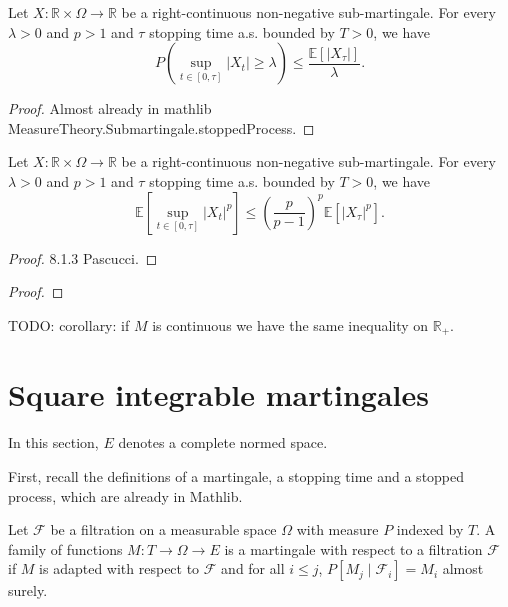\begin{lemma}\label{lem:doob_ineq_stop}
  Let $X:\mathbb{R}\times\Omega\rightarrow \mathbb{R}$ be a right-continuous non-negative sub-martingale.
  For every $\lambda>0$ and $p>1$ and $\tau$ stopping time a.s. bounded by $T>0$, we have
  $$
  P\left( \sup_{t\in[0,\tau]}|X_t|\geq\lambda \right)\leq \frac{\mathbb{E}[|X_\tau|]}{\lambda}.
  $$
\end{lemma}
\begin{proof}
  Almost already in mathlib MeasureTheory.Submartingale.stoppedProcess.
\end{proof}

\begin{lemma}\label{lem:doob_ineq_stop_exp_val}
  Let $X:\mathbb{R}\times\Omega\rightarrow \mathbb{R}$ be a right-continuous non-negative sub-martingale.
  For every $\lambda>0$ and $p>1$ and $\tau$ stopping time a.s. bounded by $T>0$, we have
  $$
  \mathbb{E}\left[ \sup_{t\in[0,\tau]}|X_t|^p \right]\leq \left(\frac{p}{p-1}\right)^p\mathbb{E}[|X_\tau|^p].
  $$
\end{lemma}
\begin{proof}
  8.1.3 Pascucci.
\end{proof}

\begin{proof}

\end{proof}

TODO: corollary: if $M$ is continuous we have the same inequality on $\mathbb{R}_+$.


\section{Square integrable martingales}

In this section, $E$ denotes a complete normed space.

First, recall the definitions of a martingale, a stopping time and a stopped process, which are already in Mathlib.


\begin{definition}[Martingale]\label{def:Martingale}
  \mathlibok
Let $\mathcal{F}$ be a filtration on a measurable space $\Omega$ with measure $P$ indexed by $T$.
A family of functions $M : T \to \Omega \to E$ is a martingale with respect to a filtration $\mathcal{F}$ if $M$ is adapted with respect to $\mathcal{F}$ and for all $i \le j$, $P[M_j \mid \mathcal{F}_i] = M_i$ almost surely.
\end{definition}


